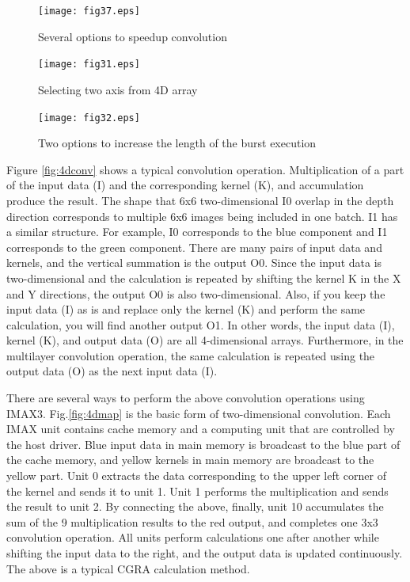 \begin{figure}[htbp]
\center
\texttt{[image: fig37.eps]}
\caption{\label{fig:options}Several options to speedup convolution}
\end{figure}

\begin{figure}[htbp]
\center
\texttt{[image: fig31.eps]}
\caption{\label{fig:twoaxis}Selecting two axis from 4D array}
\end{figure}

\begin{figure}[htbp]
\center
\texttt{[image: fig32.eps]}
\caption{\label{fig:optimal}Two options to increase the length of the burst execution}
\end{figure}
 
Figure \ref{fig:4dconv} shows a typical convolution
operation. Multiplication of a part of the input data (I) and the
corresponding kernel (K), and accumulation produce the result. The shape
that 6x6 two-dimensional I0 overlap in the depth direction corresponds to
multiple 6x6 images being included in one batch. I1 has a similar structure.
For example, I0 corresponds to the blue component and I1 corresponds to the
green component. There are many pairs of input data and kernels, and the
vertical summation is the output O0. Since the input data is two-dimensional
and the calculation is repeated by shifting the kernel K in the X and Y
directions, the output O0 is also two-dimensional. Also, if you keep the
input data (I) as is and replace only the kernel (K) and perform the same
calculation, you will find another output O1. In other words, the input data
(I), kernel (K), and output data (O) are all 4-dimensional
arrays. Furthermore, in the multilayer convolution operation, the same
calculation is repeated using the output data (O) as the next input data
(I).

There are several ways to perform the above convolution operations using
IMAX3. Fig.\ref{fig:4dmap} is the basic form of two-dimensional convolution.
Each IMAX unit contains cache memory and a computing unit that are
controlled by the host driver. Blue input data in main memory is broadcast
to the blue part of the cache memory, and yellow kernels in main memory are
broadcast to the yellow part. Unit 0 extracts the data corresponding to the
upper left corner of the kernel and sends it to unit 1. Unit 1 performs the
multiplication and sends the result to unit 2. By connecting the above,
finally, unit 10 accumulates the sum of the 9 multiplication results to the
red output, and completes one 3x3 convolution operation. All units perform
calculations one after another while shifting the input data to the right,
and the output data is updated continuously. The above is a typical CGRA
calculation method.

